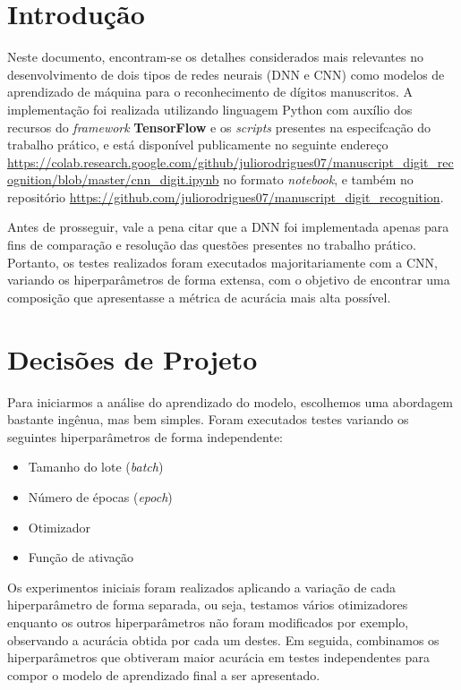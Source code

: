 \documentclass[a4paper, 12pt]{article}
\begin{document}
\tableofcontents
\newpage

\section{Introdução}

Neste documento, encontram-se os detalhes considerados mais relevantes no desenvolvimento de dois tipos de redes neurais (DNN e CNN) como modelos de aprendizado de máquina para o reconhecimento de dígitos manuscritos. A implementação foi realizada utilizando linguagem Python com auxílio dos recursos do \emph{framework} \textbf{TensorFlow} e os \emph{scripts} presentes na especifcação do trabalho prático, e está disponível publicamente no seguinte endereço \url{https://colab.research.google.com/github/juliorodrigues07/manuscript_digit_recognition/blob/master/cnn_digit.ipynb} no formato \emph{notebook}, e também no repositório \url{https://github.com/juliorodrigues07/manuscript_digit_recognition}.

Antes de prosseguir, vale a pena citar que a DNN foi implementada apenas para fins de comparação e resolução das questões presentes no trabalho prático. Portanto, os testes realizados foram executados majoritariamente com a CNN, variando os hiperparâmetros de forma extensa, com o objetivo de encontrar uma composição que apresentasse a métrica de acurácia mais alta possível.
    
\section{Decisões de Projeto}

Para iniciarmos a análise do aprendizado do modelo, escolhemos uma abordagem bastante ingênua, mas bem simples. Foram executados testes variando os seguintes hiperparâmetros de forma independente:

\begin{itemize}
    \item Tamanho do lote (\emph{batch})
    \item Número de épocas (\emph{epoch})
    \item Otimizador
    \item Função de ativação
\end{itemize}

Os experimentos iniciais foram realizados aplicando a variação de cada hiperparâmetro de forma separada, ou seja, testamos vários otimizadores enquanto os outros hiperparâmetros não foram modificados por exemplo, observando a acurácia obtida por cada um destes. Em seguida, combinamos os hiperparâmetros que obtiveram maior acurácia em testes independentes para compor o modelo de aprendizado final a ser apresentado.
\end{document}
